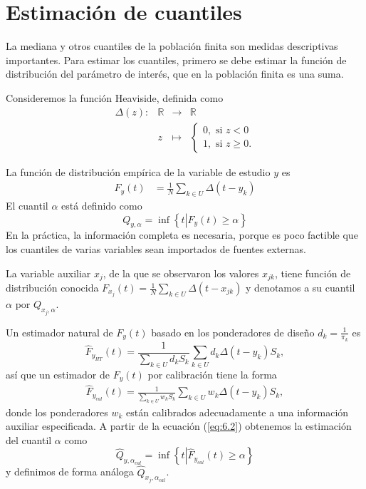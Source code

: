 \documentclass[a4paper,twoside,openright,12pt]{book}
\theoremstyle{definition}
\newcommand\pref[1]{(\ref{#1})}
\numberwithin{equation}{chapter}
\numberwithin{figure}{chapter}
\numberwithin{table}{chapter}
\numberwithin{theorem}{chapter}
\numberwithin{lemma}{chapter}
\begin{document}
\section{Estimación de cuantiles}
La mediana y otros cuantiles de la población finita son medidas descriptivas importantes. Para estimar los cuantiles, primero se debe estimar la función de distribución del parámetro de interés, que en la población finita es una suma. %

Consideremos la función Heaviside, definida como
$$\begin{matrix}\Delta(z):&\mathbb R& \rightarrow &\mathbb R \\ &z&\mapsto &\left\{\begin{matrix}0,\text{ si } z<0\\ 1,\text{ si } z\geq 0.\end{matrix}\right.\end{matrix}$$

La función de distribución empírica de la variable de estudio $y$ es
\begin{align}
	F_y(t)&=\frac{1}{N} \sum_{k\in U} \Delta(t-y_k)
\end{align}
El cuantil $\alpha$ está definido como
$$Q_{y,\alpha}=\inf\left\{t\left|F_y(t)\geq\alpha\right.\right\}$$
En la práctica, la información completa es necesaria, porque es poco factible que los cuantiles de varias variables sean importados de fuentes externas.

La variable auxiliar $x_j$, de la que se observaron los valores $x_{jk}$, tiene función de distribución conocida $F_{x_j}(t)=\frac{1}{N} \sum_{k\in U} \Delta(t-x_{jk})$ y denotamos a su cuantil $\alpha$ por $Q_{x_j,\alpha}$.

Un estimador natural de $F_y(t)$ basado en los ponderadores de diseño $d_k=\frac{1}{\pi_k}$ es
$$\hat F_{y_{HT}}(t)=\frac{1}{\sum_{k\in U}d_kS_k}\sum_{k\in U}d_k \Delta(t-y_k)S_k,$$
así que un estimador de $F_y(t)$ por calibración tiene la forma
\begin{align}\label{eq:6.2}
	\hat F_{y_{cal}}(t)=\frac{1}{\sum_{k\in U}w_kS_k}\sum_{k\in U}w_k \Delta(t-y_k)S_k,
\end{align}
donde los ponderadores $w_k$ están calibrados adecuadamente a una información auxiliar especificada. A partir de la ecuación \pref{eq:6.2} obtenemos la estimación del cuantil $\alpha$ como
$$\hat Q_{y,\alpha_{cal}}=\inf\left\{t\left|\hat F_{y_{cal}}(t)\geq\alpha\right.\right\}$$
y definimos de forma análoga $\hat Q_{x_j,\alpha_{cal}}$.
\end{document}
